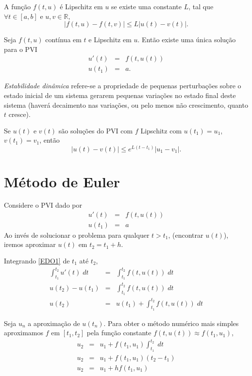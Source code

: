 \begin{defn}
A função $f(t, u)$ é Lipschitz em $u$ se existe uma constante $L$, tal que $\forall t \in [a, b]$ e $u,v \in \mathbb R$,
$$ |f(t, u)-f(t, v)| \leq L|u(t)-v(t)|. $$
\end{defn}


\begin{teo}
Seja $f(t, u)$ contínua em $t$ e Lipschitz em $u$. Então existe uma única solução para o PVI
\begin{eqnarray}
  u'(t)  &=& f(t, u(t)) \\
  u(t_1) &=& a.
\end{eqnarray}
\end{teo}

\begin{defn}
  \emph{Estabilidade dinâmica} refere-se a propriedade de pequenas perturbações sobre o estado inicial de um sistema gerarem pequenas variações no estado final deste sistema (haverá decaimento nas variações, ou pelo menos não crescimento, quanto $t$ cresce).
\end{defn}

\begin{teo}
Se $u(t)$ e $v(t)$ são soluções do PVI com $f$ Lipschitz com $u(t_1)=u_1$, $v(t_1)=v_1$, então
$$ |u(t)-v(t)| \leq  e^{L(t-t_1)}|u_1-v_1| . $$
\end{teo}

\section{Método de Euler}
Considere o PVI dado por
\begin{eqnarray}\label{EDO1}
  u'(t)  &=& f(t,u(t)) \\
  u(t_1) &=& a
\end{eqnarray}
Ao invés de solucionar o problema para qualquer $t>t_1$, (encontrar $u(t)$), iremos aproximar $u(t)$ em $t_2=t_1+h$.

Integrando \eqref{EDO1} de $t_1$ até $t_2$,
\begin{eqnarray}
  \int_{t_1}^{t_2} u'(t) \;dt &=& \int_{t_1}^{t_2} f(t,u(t)) \; dt\\
  u(t_2)-u(t_1)               &=& \int_{t_1}^{t_2} f(t,u(t)) \; dt\\
  u(t_2)                      &=& u(t_1) +  \int _{t_1}^{t_2} f(t,u(t)) \; dt
\end{eqnarray}

Seja $u_n$ a aproximação de $u(t_n)$. Para obter o método numérico mais simples aproximamos $f$ em $[t_1,t_2]$ pela função constante $f(t,u(t)) \approx  f(t_1,u_1)$,
\begin{eqnarray}
  u_2 &=&  u_1 +   f(t_1,u_1) \int _{t_1}^{t_2}  \; dt \\
  u_2 &=&  u_1 +   f(t_1,u_1) (t_2-t_1) \\
  u_2 &=&  u_1 + h f(t_1,u_1)
\end{eqnarray}

